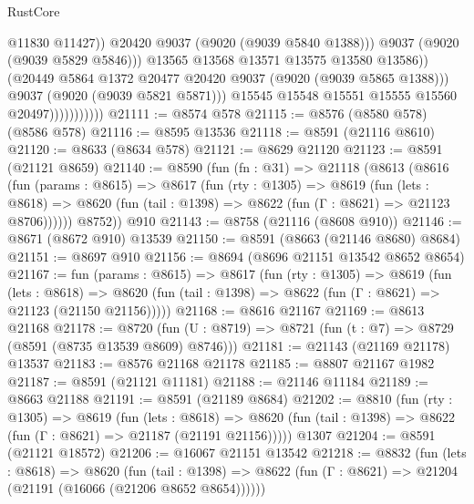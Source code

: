 \begin{lexlean}{RustCore}
\begin{coremodule}
                                        @11830
                                        @11427))
                                    @20420
                                    @9037
                                    (@9020 (@9039 @5840 @1388)))
                                  @9037
                                  (@9020 (@9039 @5829 @5846)))
                                @13565
                                @13568
                                @13571
                                @13575
                                @13580
                                @13586))
                            (@20449 @5864 @1372 @20477 @20420 @9037 (@9020 (@9039 @5865 @1388)))
                            @9037
                            (@9020 (@9039 @5821 @5871)))
                          @15545
                          @15548
                          @15551
                          @15555
                          @15560
                          @20497)))))))))))
@21111 := @8574 @578
@21115 := @8576 (@8580 @578) (@8586 @578)
@21116 := @8595 @13536
@21118 := @8591 (@21116 @8610)
@21120 := @8633 (@8634 @578)
@21121 := @8629 @21120
@21123 := @8591 (@21121 @8659)
@21140 := @8590
    (fun (fn : @31) =>
    @21118
      (@8613
        (@8616
          (fun (params : @8615) =>
          @8617
            (fun (rty : @1305) =>
            @8619
              (fun (lets : @8618) =>
              @8620 (fun (tail : @1398) => @8622 (fun (Γ : @8621) => @21123 @8706))))))
        @8752))
    @910
@21143 := @8758 (@21116 (@8608 @910))
@21146 := @8671 (@8672 @910) @13539
@21150 := @8591 (@8663 (@21146 @8680) @8684)
@21151 := @8697 @910
@21156 := @8694 (@8696 @21151 @13542 @8652 @8654)
@21167 := fun (params : @8615) =>
  @8617
    (fun (rty : @1305) =>
    @8619
      (fun (lets : @8618) =>
      @8620 (fun (tail : @1398) => @8622 (fun (Γ : @8621) => @21123 (@21150 @21156)))))
@21168 := @8616 @21167
@21169 := @8613 @21168
@21178 := @8720
    (fun (U : @8719) => @8721 (fun (t : @7) => @8729 (@8591 (@8735 @13539 @8609) @8746)))
@21181 := @21143 (@21169 @21178) @13537
@21183 := @8576 @21168 @21178
@21185 := @8807 @21167 @1982
@21187 := @8591 (@21121 @11181)
@21188 := @21146 @11184
@21189 := @8663 @21188
@21191 := @8591 (@21189 @8684)
@21202 := @8810
    (fun (rty : @1305) =>
    @8619
      (fun (lets : @8618) =>
      @8620 (fun (tail : @1398) => @8622 (fun (Γ : @8621) => @21187 (@21191 @21156)))))
    @1307
@21204 := @8591 (@21121 @18572)
@21206 := @16067 @21151 @13542
@21218 := @8832
    (fun (lets : @8618) =>
    @8620
      (fun (tail : @1398) =>
      @8622 (fun (Γ : @8621) => @21204 (@21191 (@16066 (@21206 @8652 @8654))))))

\end{coremodule}
\end{lexlean}
